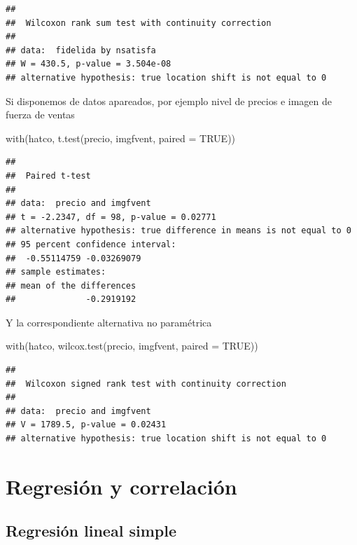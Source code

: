 \documentclass[
]{book}
\newenvironment{Shaded}{\begin{snugshade}}{\end{snugshade}}
\newcommand{\AttributeTok}[1]{\textcolor[rgb]{0.77,0.63,0.00}{#1}}
\newcommand{\ConstantTok}[1]{\textcolor[rgb]{0.00,0.00,0.00}{#1}}
\newcommand{\FunctionTok}[1]{\textcolor[rgb]{0.00,0.00,0.00}{#1}}
\newcommand{\NormalTok}[1]{#1}
\theoremstyle{break}
\begin{document}
\begin{verbatim}
## 
##  Wilcoxon rank sum test with continuity correction
## 
## data:  fidelida by nsatisfa
## W = 430.5, p-value = 3.504e-08
## alternative hypothesis: true location shift is not equal to 0
\end{verbatim}

Si disponemos de datos apareados, por ejemplo nivel de precios e imagen
de fuerza de ventas

\begin{Shaded}
\begin{Highlighting}[]
\FunctionTok{with}\NormalTok{(hatco, }\FunctionTok{t.test}\NormalTok{(precio, imgfvent, }\AttributeTok{paired =} \ConstantTok{TRUE}\NormalTok{))}
\end{Highlighting}
\end{Shaded}

\begin{verbatim}
## 
##  Paired t-test
## 
## data:  precio and imgfvent
## t = -2.2347, df = 98, p-value = 0.02771
## alternative hypothesis: true difference in means is not equal to 0
## 95 percent confidence interval:
##  -0.55114759 -0.03269079
## sample estimates:
## mean of the differences 
##              -0.2919192
\end{verbatim}

Y la correspondiente alternativa no paramétrica

\begin{Shaded}
\begin{Highlighting}[]
\FunctionTok{with}\NormalTok{(hatco, }\FunctionTok{wilcox.test}\NormalTok{(precio, imgfvent, }\AttributeTok{paired =} \ConstantTok{TRUE}\NormalTok{))}
\end{Highlighting}
\end{Shaded}

\begin{verbatim}
## 
##  Wilcoxon signed rank test with continuity correction
## 
## data:  precio and imgfvent
## V = 1789.5, p-value = 0.02431
## alternative hypothesis: true location shift is not equal to 0
\end{verbatim}

\hypertarget{regresiuxf3n-y-correlaciuxf3n}{%
\section{Regresión y correlación}\label{regresiuxf3n-y-correlaciuxf3n}}

\hypertarget{regresiuxf3n-lineal-simple}{%
\subsection{Regresión lineal simple}\label{regresiuxf3n-lineal-simple}}
\end{document}
